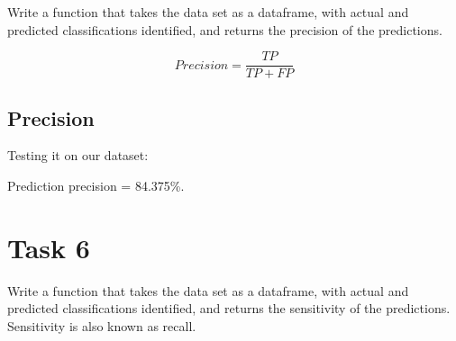 \documentclass[]{article}
\newenvironment{Shaded}{\begin{snugshade}}{\end{snugshade}}
\newcommand{\KeywordTok}[1]{\textcolor[rgb]{0.13,0.29,0.53}{\textbf{#1}}}
\newcommand{\DecValTok}[1]{\textcolor[rgb]{0.00,0.00,0.81}{#1}}
\newcommand{\StringTok}[1]{\textcolor[rgb]{0.31,0.60,0.02}{#1}}
\newcommand{\CommentTok}[1]{\textcolor[rgb]{0.56,0.35,0.01}{\textit{#1}}}
\newcommand{\ControlFlowTok}[1]{\textcolor[rgb]{0.13,0.29,0.53}{\textbf{#1}}}
\newcommand{\OperatorTok}[1]{\textcolor[rgb]{0.81,0.36,0.00}{\textbf{#1}}}
\newcommand{\NormalTok}[1]{#1}
\begin{document}
Write a function that takes the data set as a dataframe, with actual and
predicted classifications identified, and returns the precision of the
predictions.

\begin{equation}
Precision = \frac{TP}{TP + FP}
\end{equation}

\subsection{Precision}\label{precision}

\begin{Shaded}
\end{Shaded}

Testing it on our dataset:

Prediction precision = 84.375\%.

\section{Task 6}\label{task-6}

Write a function that takes the data set as a dataframe, with actual and
predicted classifications identified, and returns the sensitivity of the
predictions. Sensitivity is also known as recall.
\end{document}
